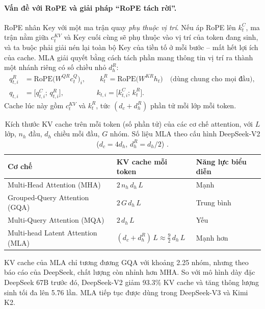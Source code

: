 \paragraph{Vấn đề với RoPE và giải pháp “RoPE tách rời”.} RoPE nhân Key với một ma trận quay \emph{phụ thuộc vị trí}. Nếu áp RoPE lên $k_t^C$, ma trận nằm giữa $c_t^{KV}$ và Key cuối cùng sẽ phụ thuộc vào vị trí của token đang sinh, và ta buộc phải giải nén lại toàn bộ Key của tiền tố ở mỗi bước -- mất hết lợi ích của cache. MLA giải quyết bằng cách tách phần mang thông tin vị trí ra thành một nhánh riêng có số chiều nhỏ $d_h^R$:
\begin{align*}
q_{t,i}^{R} &= \text{RoPE}\big(W^{QR} c_t^{Q}\big)_i, \qquad
k_t^{R} = \text{RoPE}\big(W^{KR} h_t\big) \quad \text{(dùng chung cho mọi đầu)},\\
q_{t,i} &= \big[q_{t,i}^{C};\, q_{t,i}^{R}\big], \qquad\qquad\;\; k_{t,i} = \big[k_{t,i}^{C};\, k_t^{R}\big].
\end{align*}
Cache lúc này gồm $c_t^{KV}$ và $k_t^R$, tức $(d_c + d_h^R)$ phần tử mỗi lớp mỗi token.

\begin{table}[H]
\centering
\caption{Kích thước KV cache trên mỗi token (số phần tử) của các cơ chế attention, với $L$ lớp, $n_h$ đầu, $d_h$ chiều mỗi đầu, $G$ nhóm. Số liệu MLA theo cấu hình DeepSeek-V2 ($d_c = 4d_h$, $d_h^R = d_h/2$) \cite{deepseekai2024v2}.}
\label{tab:kv_cache_comparison}
\begin{tabular}{@{}lll@{}}
\toprule
\textbf{Cơ chế} & \textbf{KV cache mỗi token} & \textbf{Năng lực biểu diễn} \\
\midrule
Multi-Head Attention (MHA) & $2\, n_h\, d_h\, L$ & Mạnh \\
Grouped-Query Attention (GQA) & $2\, G\, d_h\, L$ & Trung bình \\
Multi-Query Attention (MQA) & $2\, d_h\, L$ & Yếu \\
Multi-head Latent Attention (MLA) & $(d_c + d_h^R)\, L \approx \tfrac{9}{2}\, d_h\, L$ & Mạnh hơn \\
\bottomrule
\end{tabular}
\end{table}

KV cache của MLA chỉ tương đương GQA với khoảng 2.25 nhóm, nhưng theo báo cáo của DeepSeek, chất lượng còn nhỉnh hơn MHA. So với mô hình dày đặc DeepSeek 67B trước đó, DeepSeek-V2 giảm 93.3\% KV cache và tăng thông lượng sinh tối đa lên 5.76 lần. MLA tiếp tục được dùng trong DeepSeek-V3 và Kimi K2.

